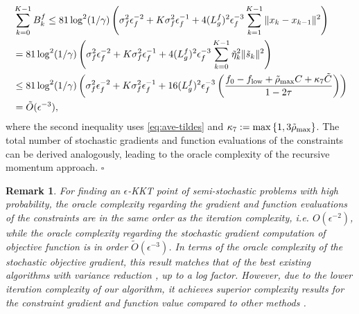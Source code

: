 \documentclass[11pt]{article}
\newtheorem{remark}{Remark}
\newenvironment{proof}{{\noindent\it Proof.}\quad}{\hfill $\square$\par}
\begin{document}
\begin{proof}
    \begin{align*}
        &\sum_{k=0}^{K-1} B_k^f \leq  81\log^2(1/\gamma)\left(\sigma_f^2\epsilon_f^{-2}+K\sigma_f^2\epsilon_f^{-1} + 4(L_g^f)^2\epsilon_f^{-3}\sum_{k=1}^{K-1} \|x_k - x_{k-1}\|^2 \right) \\
        &=  81\log^2(1/\gamma)\left(\sigma_f^2\epsilon_f^{-2}+K\sigma_f^2\epsilon_f^{-1} + 4(L_g^f)^2\epsilon_f^{-3}\sum_{k=0}^{K-1}\tilde \eta_k^2 \|\tilde s_k\|^2 \right)\\
        &\leq  81\log^2(1/\gamma)\left(\sigma_f^2\epsilon_f^{-2}+K\sigma_f^2\epsilon_f^{-1} + 16(L_g^f)^2\epsilon_f^{-3}\left(\frac{f_0-f_{\rm low}+\tilde \rho_{\rm max} C+\kappa_7 \tilde C}{1-2\tau}\right) \right) \\&= \tilde O(\epsilon^{-3}),
    \end{align*}
    where the second inequality uses \eqref{eq:ave-tildes} and \(\kappa_7 := \max \left\{1,3\tilde \rho_{\rm max}\right\}\). The total number of stochastic gradients and function evaluations  of the constraints can be derived analogously, leading to the oracle complexity of the recursive momentum approach.
\end{proof}

\begin{remark}\label{rm:semi-rm}
    For finding an \(\epsilon\)-KKT point of semi-stochastic problems with high probability, the oracle complexity regarding the gradient and function evaluations of the constraints are in the same order as the iteration complexity, i.e. \(O(\epsilon^{-2})\), while the oracle complexity regarding the  stochastic gradient computation of objective function is in order  \(\tilde O(\epsilon^{-3})\). In terms of the oracle complexity of the stochastic objective gradient, this result matches that of the best existing algorithms with variance reduction \cite{idrees2024constrained,lu2024variance,shi2025momentum}, up to a log factor. However, due to the lower iteration complexity of our algorithm, it achieves superior complexity results for the constraint gradient and function value compared to other methods \cite{idrees2024constrained,lu2024variance,shi2025momentum}.
\end{remark}
\end{document}
